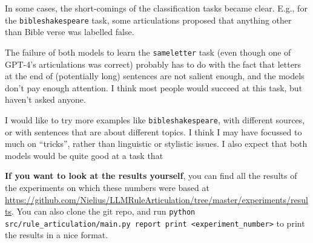 \documentclass{article}
\newcommand{\gptf}{GPT-4}
\begin{document}
In some cases, the short-comings of the classification tasks became clear.
E.g., for the \texttt{bibleshakespeare} task,
some articulations proposed that anything other than Bible verse was labelled false.

The failure of both models to learn the \texttt{sameletter} task
(even though one of \gptf{}'s articulations was correct)
probably has to do with the fact that letters at the end of (potentially long)
sentences are not salient enough,
and the models don't pay enough attention.
I think most people would succeed at this task,
but haven't asked anyone.

I would like to try more examples like \texttt{bibleshakespeare},
with different sources, or with sentences that are about different topics.
I think I may have focussed to much on ``tricks'', rather than linguistic or stylistic issues.
I also expect that both models would be quite good at a task that

\textbf{If you want to look at the results yourself},
you can find all the results of the experiments on which these numbers were based
at \url{https://github.com/Nielius/LLMRuleArticulation/tree/master/experiments/results}.
You can also clone the git repo, and run
\verb|python src/rule_articulation/main.py report print <experiment_number>|
to print the results in a nice format.













\end{document}

